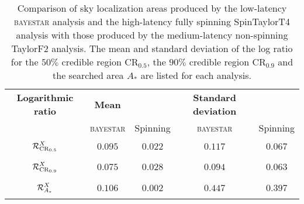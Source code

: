 \begin{table}
\begin{tabular}{ccccc}
\textbf{Logarithmic ratio} & \textbf{Mean} & & \textbf{Standard deviation} & \\   
 & \textsc{bayestar} & Spinning & \textsc{bayestar} & Spinning \\
$\displaystyle \vphantom{\frac{0}{0}} \mathcal{R}^X_{\mathrm{CR}_{0.5}}$ & $0.095$ & $0.022$ & $0.117$ & $0.067$ \\
$\displaystyle \vphantom{\frac{0}{0}} \mathcal{R}^X_{\mathrm{CR}_{0.9}}$ & $0.075$ & $0.028$ & $0.094$ & $0.063$ \\
$\displaystyle \vphantom{\frac{0}{0}} \mathcal{R}^X_{A_\ast}$ & $0.106$ & $0.002$ & $0.447$ & $0.397$
\end{tabular}
\label{tab:sky-ratio} \caption{Comparison of sky localization areas produced by the low-latency \textsc{bayestar} analysis and the high-latency fully spinning SpinTaylorT4 analysis with those produced by the medium-latency non-spinning TaylorF2 analysis. The mean and standard deviation of the log ratio for the $50\%$ credible region $\mathrm{CR}_{0.5}$, the $90\%$ credible region $\mathrm{CR}_{0.9}$ and the searched area $A_\ast$ are listed for each analysis.}

\end{table}
  
  
  
  
